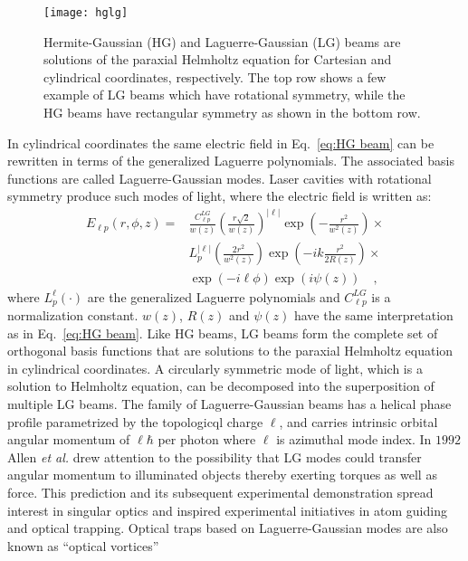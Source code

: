 \begin{figure}[t!]
  \centering
  \texttt{[image: hglg]}
  \caption{Hermite-Gaussian (HG) and Laguerre-Gaussian (LG) beams are solutions of the paraxial Helmholtz equation for Cartesian and cylindrical coordinates, respectively. The top row shows a few example of LG beams which have rotational symmetry, while the HG beams have rectangular symmetry as shown in the bottom row.}
  \label{fig:hglg}
\end{figure}


In cylindrical coordinates the same electric field in Eq.~\eqref{eq:HG beam} can be rewritten in terms of the generalized Laguerre polynomials. The associated basis functions are called Laguerre-Gaussian modes. Laser cavities with rotational symmetry produce such modes of light, where the electric field is written as:
\begin{equation}
\label{eq: LG Beam}
\begin{split}
E_{\ell p}(r,\phi, z) = & \frac{C^{LG}_{\ell p}}{w(z)}\left(\frac{r\sqrt{2}}{w(z)}\right) ^{|\ell|}\exp \left(-\frac{r^2}{w^2 (z)}\right) \times \\
							& L^{|\ell|}_{p}\left(\frac{2r^2}{w^2(z)}\right) \exp \left( -ik\frac{r^2}{2R(z)}\right) \times \\
							& \exp (-i\ell\phi) \exp (i\psi(z)) \quad ,
\end{split}
\end{equation}
where $L^{\ell}_{p} (\cdot)$ are the generalized Laguerre polynomials and $C^{LG}_{\ell p}$ is a normalization constant. $w(z)$, $R(z)$ and $\psi (z)$ have the same interpretation as in Eq.~\eqref{eq:HG beam}. Like HG beams, LG beams form the complete set of orthogonal basis functions that are solutions to the paraxial Helmholtz equation in cylindrical coordinates. A circularly symmetric mode of light, which is a solution to Helmholtz equation, can be decomposed into the superposition of multiple LG beams. The family of Laguerre-Gaussian beams has a helical phase profile parametrized by the topologicql charge $\ell$, and carries intrinsic orbital angular momentum of $\ell \hbar$ per photon \cite{allen1992} where $\ell$ is azimuthal mode index. In $\mathrm{1992}$ Allen \emph{et al.} drew attention to the possibility that LG modes could transfer angular momentum to illuminated objects thereby exerting torques as well as force. This prediction and its subsequent experimental demonstration spread interest in singular optics and inspired experimental initiatives in atom guiding and optical trapping. Optical traps based on Laguerre-Gaussian modes are also known as ``optical vortices'' 

